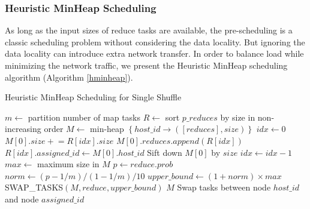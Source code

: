 \subsubsection{Heuristic MinHeap Scheduling}\label{h-minheap}

As long as the input sizes of reduce tasks are available, the pre-scheduling is a classic scheduling problem without considering the data locality. 
But ignoring the data locality can introduce extra network transfer. 
In order to balance load while minimizing the network traffic, we present the Heuristic MinHeap scheduling algorithm (Algorithm \ref{hminheap}).   

\noindent
\begin{minipage}{0.95\columnwidth}
\begin{algorithm}[H]
\caption{Heuristic MinHeap Scheduling for Single Shuffle}
\label{hminheap}
	\begin{algorithmic}[1]
	\small
		\State $m\gets$ partition number of map tasks
		\State $R\gets$ sort $p\_reduces$ by size in non-increasing order
		\State $M\gets$ min-heap $\left\{ host\_id \rightarrow \left( \left[ reduces \right], size \right) \right\}$
		\State $idx\gets 0$
		\State{}
			\State $M\left[0\right].size \mathrel{+}= R\left[idx\right].size$
			\State $M\left[0\right].reduces.append\left(R\left[idx\right]\right)$
			\State $R\left[idx\right].assigned\_id \gets M \left[0\right].host\_id$
			\State Sift down $M\left[0\right]$ by $size$
			\State $idx\gets idx-1$
		\EndWhile
		\State $max\gets$ maximum size in $M$
				\State $p\gets reduce.prob$
				\State $norm\gets \left(p-1/m\right)/\left(1-1/m\right)/10$
				\State $upper\_bound \gets \left(1 + norm\right) \times max$
				\State SWAP\_TASKS$\left(M, reduce, upper\_bound\right)$
			\EndIf
		\EndFor
		\Return $M$
	\EndProcedure
		\State Swap tasks between node $host\_id$ and node $assigned\_id$

\end{algorithmic}
\end{algorithm}
\end{minipage}
